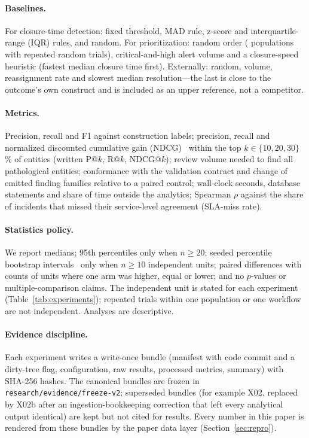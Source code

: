 \paragraph{Baselines.}
For closure-time detection: fixed threshold, MAD rule, z-score and
interquartile-range (IQR) rules, and random. For prioritization: random order
( populations with repeated random trials), critical-and-high alert volume and a
closure-speed heuristic (fastest median closure time first). Externally: random, volume,
reassignment rate and slowest median resolution---the last is close to the
outcome's own construct and is included as an upper reference, not a competitor.

\paragraph{Metrics.}
Precision, recall and F1 against construction labels; precision, recall and
normalized discounted cumulative gain (NDCG)~\cite{jarvelin2002ndcg} within the top $k\in\{10,20,30\}$\% of entities
(written P@$k$, R@$k$, NDCG@$k$);
review volume needed to find all pathological entities; conformance with the
validation contract and change of emitted finding families relative to a paired control;
wall-clock seconds, database statements and share of time outside the analytics;
Spearman $\rho$ against the share of incidents that missed their service-level
agreement (SLA-miss rate).

\paragraph{Statistics policy.}
We report medians; 95th percentiles only when $n\ge20$; seeded percentile
bootstrap intervals~\cite{efron1993bootstrap} only when $n\ge10$ independent
units; paired differences with counts of units where one arm was higher, equal or
lower; and no $p$-values or multiple-comparison claims. The independent unit is
stated for each experiment (Table~\ref{tab:experiments}); repeated trials within
one population or one workflow are not independent. Analyses are descriptive.

\paragraph{Evidence discipline.}
Each experiment writes a write-once bundle (manifest with code commit and a
dirty-tree flag, configuration, raw results, processed metrics, summary) with
SHA-256 hashes. The canonical bundles are frozen in
\texttt{research/evidence/freeze-v2}; superseded bundles (for example X02,
replaced by X02b after an ingestion-bookkeeping correction that left every
analytical output identical) are kept but not cited for results.
Every number in this paper is rendered from these bundles by the paper data layer
(Section~\ref{sec:repro}).
